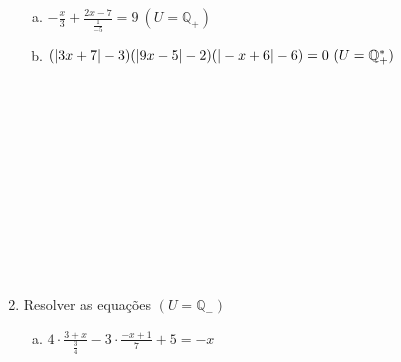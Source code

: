 \documentclass[a4paper,14pt]{article}
\begin{document}
\begin{multicols}{2}
\begin{enumerate}
\begin{enumerate}[a)]
				\item $-\frac{x}{3} + \frac{2x - 7}{\frac{1}{-5}} = 9~(U = \mathbb{Q_+})$ \newpage
				\item $(|3x + 7| - 3)(|9x - 5| - 2)\\(|-x + 6|-6) = 0~(U = \mathbb{Q_+^*})$ \\\\\\\\\\\\\\\\\\\\\\\\
			\end{enumerate}
			\item Resolver as equações $(U = \mathbb{Q_-})$
			\begin{enumerate}[a)]
				\item $4 \cdot \frac{3 + x}{\frac{3}{4}} - 3 \cdot \frac{-x + 1}{7} + 5 = -x$ \\\\\\\\\\\\\\\\\\\\\\\\\\\\\\\\\\\\\\\\\\\\\\\\\\

\end{enumerate}
\end{enumerate}
\end{multicols}
\end{document}
